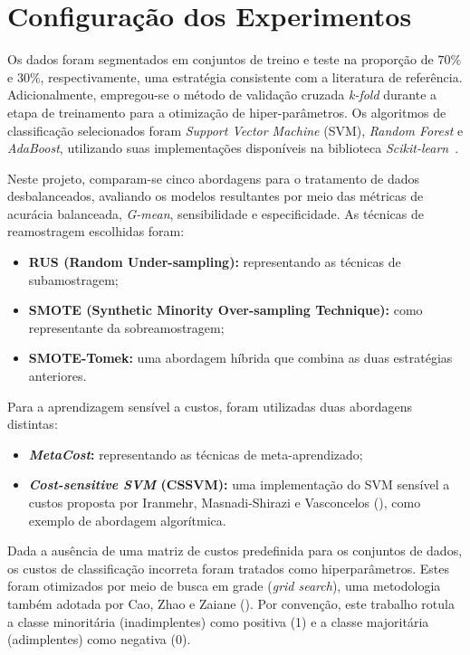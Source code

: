 \section{Configuração dos Experimentos}\label{sec:configuracao-experimentos}

Os dados foram segmentados em conjuntos de treino e teste na proporção de \(70\%\) e \(30\%\), respectivamente, uma estratégia consistente com a literatura de referência. Adicionalmente, empregou-se o método de validação cruzada \textit{k-fold} durante a etapa de treinamento para a otimização de hiper-parâmetros. Os algoritmos de classificação selecionados foram \textit{Support Vector Machine} (SVM), \textit{Random Forest} e \textit{AdaBoost}, utilizando suas implementações disponíveis na biblioteca \textit{Scikit-learn}~\cite{Pedregosa2011scikit}.

Neste projeto, comparam-se cinco abordagens para o tratamento de dados desbalanceados, avaliando os modelos resultantes por meio das métricas de acurácia balanceada, \textit{G-mean}, sensibilidade e especificidade. As técnicas de reamostragem escolhidas foram:
\begin{itemize}
  \item \textbf{RUS (Random Under-sampling):} representando as técnicas de subamostragem;
  \item \textbf{SMOTE (Synthetic Minority Over-sampling Technique):} como representante da sobreamostragem;
  \item \textbf{SMOTE-Tomek:} uma abordagem híbrida que combina as duas estratégias anteriores.
\end{itemize}
Para a aprendizagem sensível a custos, foram utilizadas duas abordagens distintas:
\begin{itemize}
  \item \textbf{\textit{MetaCost}:} representando as técnicas de meta-aprendizado;
  \item \textbf{\textit{Cost-sensitive SVM} (CSSVM):} uma implementação do SVM sensível a custos proposta por Iranmehr, Masnadi-Shirazi e Vasconcelos (\citeyear{Iranmehr2019}), como exemplo de abordagem algorítmica.
\end{itemize}

Dada a ausência de uma matriz de custos predefinida para os conjuntos de dados, os custos de classificação incorreta foram tratados como hiperparâmetros. Estes foram otimizados por meio de busca em grade (\textit{grid search}), uma metodologia também adotada por Cao, Zhao e Zaiane (\citeyear{Cao2013}). Por convenção, este trabalho rotula a classe minoritária (inadimplentes) como positiva (1) e a classe majoritária (adimplentes) como negativa (0).